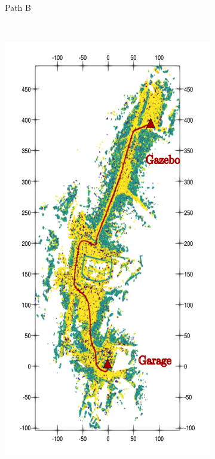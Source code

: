 \begin{figure}[htpb]
\begin{center}
\begin{subfigure}[b]{0.32\textwidth}
			\label{fig:ltr_b}
			\caption{Path B}
		\end{subfigure}%
		~
		\begin{subfigure}[b]{0.32\textwidth}
			\includegraphics[width=\linewidth]{figs/ltr_map_traj/path_c.pdf}

\end{subfigure}
\end{center}
\end{figure}
